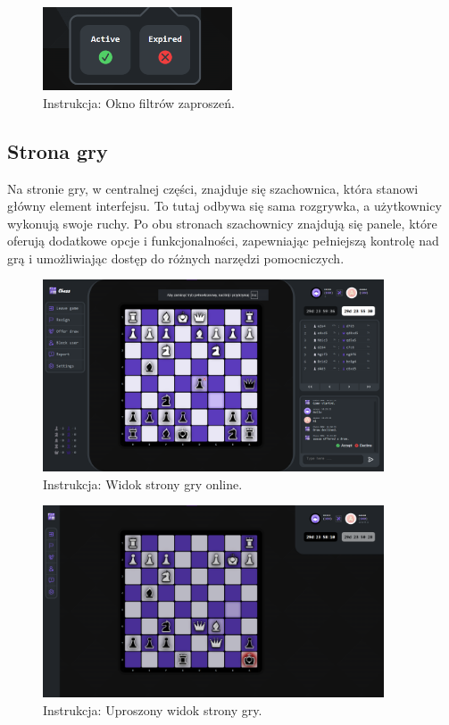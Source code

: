 \documentclass[12pt,a4paper]{article}
\begin{document}
\vspace{0.5cm}
\begin{figure}[h!]
    \centering
    \includegraphics[width=0.5\textwidth]{images/ins_filters.png}
    \caption{Instrukcja: Okno filtrów zaproszeń.}
\end{figure}

\newpage

\subsection{Strona gry}

\noindent
Na stronie gry, w centralnej części, znajduje się szachownica, która stanowi główny element interfejsu. To tutaj odbywa się sama rozgrywka, a użytkownicy wykonują swoje ruchy. Po obu stronach szachownicy znajdują się panele, które oferują dodatkowe opcje i funkcjonalności, zapewniając pełniejszą kontrolę nad grą i umożliwiając dostęp do różnych narzędzi pomocniczych.

\vspace{1cm}
\begin{figure}[h!]
    \centering
    \includegraphics[width=0.9\textwidth]{images/ins_webgame.png}
    \caption{Instrukcja: Widok strony gry online.}
\end{figure}

\begin{figure}[h!]
    \centering
    \includegraphics[width=0.9\textwidth]{images/ins_simpgame.png}
    \caption{Instrukcja: Uproszony widok strony gry.}
\end{figure}
\end{document}
